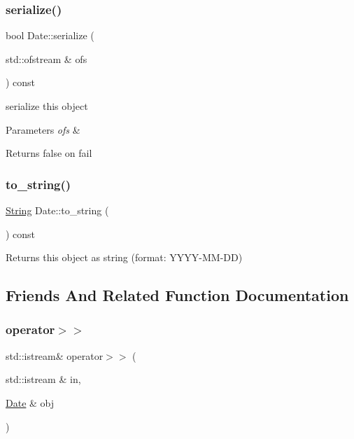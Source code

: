 \mbox{\label{classDate_aaa7c624e382fff1ba3438cb46232c05e}} 
\subsubsection{\texorpdfstring{serialize()}{serialize()}}
{\footnotesize\ttfamily bool Date\+::serialize (\begin{DoxyParamCaption}\item[{std\+::ofstream \&}]{ofs }\end{DoxyParamCaption}) const}

serialize this object 
\begin{DoxyParams}{Parameters}
{\em ofs} & \\
\hline
\end{DoxyParams}
\begin{DoxyReturn}{Returns}
false on fail 
\end{DoxyReturn}
\mbox{\label{classDate_a4d4dfda9dfa34c87e06381254bfe5151}} 
\subsubsection{\texorpdfstring{to\+\_\+string()}{to\_string()}}
{\footnotesize\ttfamily \hyperlink{classString}{String} Date\+::to\+\_\+string (\begin{DoxyParamCaption}{ }\end{DoxyParamCaption}) const}

\begin{DoxyReturn}{Returns}
this object as string (format\+: Y\+Y\+Y\+Y-\/\+M\+M-\/\+DD) 
\end{DoxyReturn}


\subsection{Friends And Related Function Documentation}
\mbox{\label{classDate_a025d4abf4e083a5f10d376259aac34a2}} 
\subsubsection{\texorpdfstring{operator$>$$>$}{operator>>}}
{\footnotesize\ttfamily std\+::istream\& operator$>$$>$ (\begin{DoxyParamCaption}\item[{std\+::istream \&}]{in,  }\item[{\hyperlink{classDate}{Date} \&}]{obj }\end{DoxyParamCaption})\hspace{0.3cm}{\ttfamily [friend]}}



